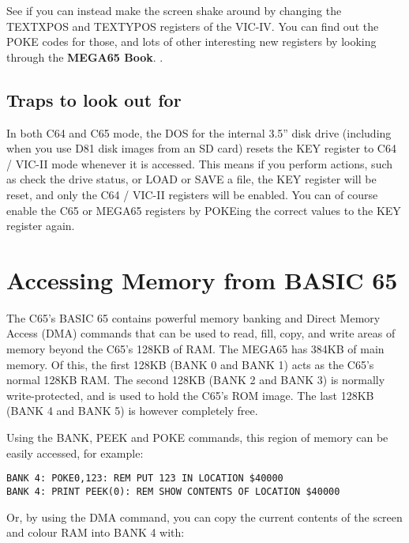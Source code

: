 See if you can instead make the screen shake around by changing the TEXTXPOS and TEXTYPOS registers of
the VIC-IV.  You can find out the POKE codes for those, and lots of other interesting new registers
by looking through
\ifdefined\printmanual
 the {\bf MEGA65 Book}.
\else
 .
\fi


\subsection{Traps to look out for}

In both C64 and C65 mode, the DOS for the internal 3.5'' disk drive (including when you use D81 disk images from
an SD card) resets the KEY register to C64 / VIC-II mode whenever it is accessed. This means if you perform actions,
such as check the drive status, or LOAD or SAVE a file, the KEY register will be reset, and only the C64 / VIC-II registers
will be enabled. You can of course enable the C65 or MEGA65 registers by POKEing the correct values
to the KEY register again.

\section{Accessing Memory from BASIC 65}

The C65's BASIC 65 contains powerful memory banking and Direct Memory Access (DMA) commands that can be used to read,
fill, copy, and write areas of memory beyond the C65's 128KB of RAM.  The MEGA65 has 384KB of main memory. Of this,
the first 128KB (BANK 0 and BANK 1) acts as the C65's normal 128KB RAM. The second 128KB (BANK 2 and BANK 3) is normally
write-protected, and is used to hold the C65's ROM image.  The last 128KB (BANK 4 and BANK 5) is however completely free.

Using the BANK, PEEK and POKE commands, this region of memory can be easily accessed, for example:

\begin{tcolorbox}[colback=black,coltext=white]
\verbatimfont{\codefont}
\begin{verbatim}
BANK 4: POKE0,123: REM PUT 123 IN LOCATION $40000
BANK 4: PRINT PEEK(0): REM SHOW CONTENTS OF LOCATION $40000
\end{verbatim}
\end{tcolorbox}

Or, by using the DMA command, you can copy the current contents of the screen and colour RAM into BANK 4 with:

